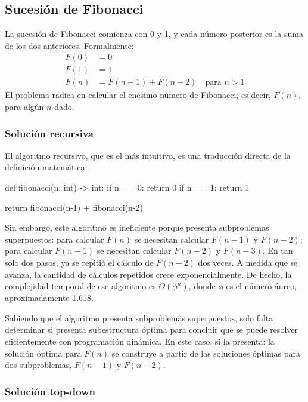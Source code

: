 \subsection{Sucesión de Fibonacci}

La sucesión de Fibonacci comienza con 0 y 1, y cada número posterior es la suma de los dos anteriores. Formalmente:
\begin{align*}
    F(0) &= 0 \\
    F(1) &= 1 \\
    F(n) &= F(n-1) + F(n-2) \quad \text{para } n > 1
\end{align*}
El problema radica en calcular el enésimo número de Fibonacci, es decir, $F(n)$, para algún $n$ dado.

\subsubsection{Solución recursiva}

El algoritmo recursivo, que es el más intuitivo, es una traducción directa de la definición matemática:
\begin{pseudocode}
def fibonacci(n: int) -> int:
    if n == 0: return 0
    if n == 1: return 1

    return fibonacci(n-1) + fibonacci(n-2)
\end{pseudocode}

Sin embargo, este algoritmo es ineficiente porque presenta subproblemas superpuestos: para calcular $F(n)$ se necesitan calcular $F(n-1)$ y $F(n-2)$; para calcular $F(n-1)$ se necesitan calcular $F(n-2)$ y $F(n-3)$. En tan solo dos pasos, ya se repitió el cálculo de $F(n-2)$ dos veces. A medida que se avanza, la cantidad de cálculos repetidos crece exponencialmente. De hecho, la complejidad temporal de ese algoritmo es $\Theta(\phi^n)$, donde $\phi$ es el número áureo, aproximadamente 1.618.

Sabiendo que el algoritmo presenta subproblemas superpuestos, solo falta determinar si presenta subestructura óptima para concluir que se puede resolver eficientemente con programación dinámica. En este caso, sí la presenta: la solución óptima para $F(n)$ se construye a partir de las soluciones óptimas para dos subproblemas, $F(n-1)$ y $F(n-2)$.

\subsubsection{Solución top-down}


